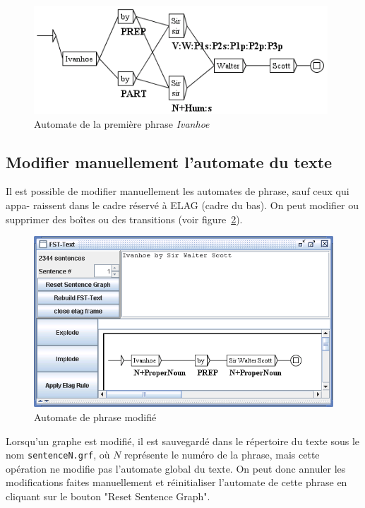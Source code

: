 \begin{figure}[!ht]
\begin{center}
\includegraphics[width=11cm]{resources/img/fig7-23.png}
\caption{Automate de la première phrase \textit{Ivanhoe}\label{fig-first-sentence-Ivanhoe}}
\end{center}
\end{figure}

\subsection{Modifier manuellement l’automate du texte}
Il est possible de modifier manuellement les automates de phrase, sauf ceux qui appa-
raissent dans le cadre réservé à ELAG (cadre du bas). On peut modifier ou supprimer des
boîtes ou des transitions (voir figure~\ref{fig-modified-sentence-automaton}).

\begin{figure}[!ht]
\begin{center}
\includegraphics[width=15cm]{resources/img/fig7-24.png}
\caption{Automate de phrase modifié\label{fig-modified-sentence-automaton}}
\end{center}
\end{figure}

\bigskip
\noindent Lorsqu’un graphe est modifié, il est sauvegardé dans le répertoire
du texte sous le nom \verb+sentenceN.grf+, où $N$ représente le numéro de la phrase,
mais cette opération ne modifie pas l'automate global du texte.
On peut donc annuler les modifications faites manuellement et réinitialiser l’automate de cette phrase
en cliquant sur le bouton "Reset Sentence Graph".

